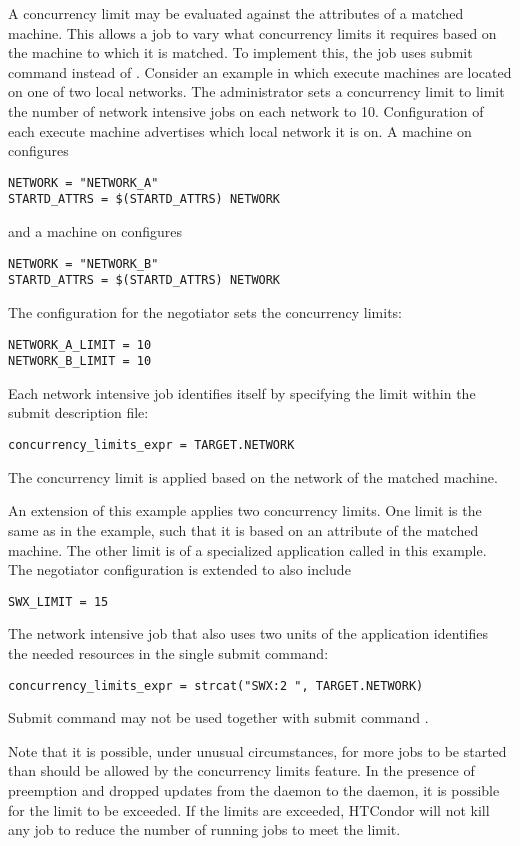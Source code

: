 A concurrency limit may be evaluated against the attributes of a 
matched machine.
This allows a job to vary what concurrency limits it requires based on
the machine to which it is matched.
To implement this, the job uses submit command 
 instead of
.
Consider an example in which execute machines are located on
one of two local networks.
The administrator sets a concurrency limit to limit the number
of network intensive jobs on each network to 10.
Configuration of each execute machine advertises which
local network it is on. 
A machine on  configures
\begin{verbatim}
NETWORK = "NETWORK_A"
STARTD_ATTRS = $(STARTD_ATTRS) NETWORK
\end{verbatim}
and a machine on  configures
\begin{verbatim}
NETWORK = "NETWORK_B"
STARTD_ATTRS = $(STARTD_ATTRS) NETWORK
\end{verbatim}

The configuration for the negotiator sets the concurrency limits:
\begin{verbatim}
NETWORK_A_LIMIT = 10
NETWORK_B_LIMIT = 10
\end{verbatim}

Each network intensive job identifies itself by specifying the limit
within the submit description file:
\begin{verbatim}
concurrency_limits_expr = TARGET.NETWORK
\end{verbatim}

The concurrency limit is applied based on the network
of the matched machine.

An extension of this example applies two concurrency limits.
One limit is the same as in the example, 
such that it is based on an attribute of the matched machine.
The other limit is of a specialized application
called  in this example.
The negotiator configuration is extended to also include
\begin{verbatim}
SWX_LIMIT = 15
\end{verbatim}

The network intensive job that also uses two units of the  
application identifies the needed resources in the single submit command:
\begin{verbatim}
concurrency_limits_expr = strcat("SWX:2 ", TARGET.NETWORK)
\end{verbatim}

Submit command  may not be used 
together with submit command .

Note that it is possible, under unusual circumstances, for more jobs to
be started than should be allowed by the concurrency limits feature.
In the presence of preemption and dropped updates from the
 daemon to the  daemon, 
it is possible for the limit to be exceeded. 
If the limits are exceeded,
HTCondor will not kill any job to reduce the number of running jobs to
meet the limit.
